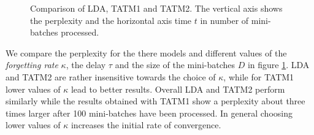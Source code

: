 \begin{figure}[ht]
{	\label{fig:kappa_tatm2}
}
\caption[Optional caption for list of figures]{Comparison of LDA, TATM1 and TATM2. The vertical axis shows the perplexity and the horizontal axis time $t$ in number of mini-batches processed.}
\label{fig:evaluation}
\end{figure}
%
We compare the perplexity for the there models and different values of the \textit{forgetting rate} $\kappa$, the delay $\tau$ and the size of the mini-batches $D$ in figure \ref{fig:evaluation}. LDA and TATM2 are rather insensitive towards the choice of $\kappa$, while for TATM1 lower values of $\kappa$ lead to better results. Overall LDA and TATM2 perform similarly while the results obtained with TATM1 show a perplexity about three times larger after 100 mini-batches have been processed. In general choosing lower values of $\kappa$ increases the initial rate of convergence.